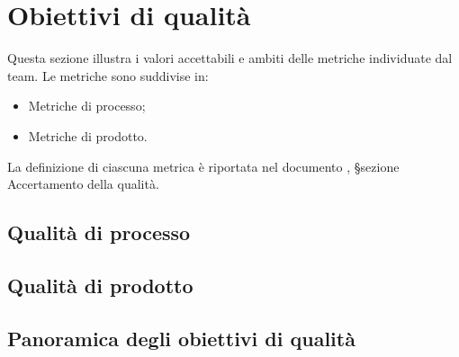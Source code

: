 \section{Obiettivi di qualità}

\par Questa sezione illustra i valori accettabili e ambiti delle metriche individuate dal team. Le metriche sono suddivise in:
\begin{itemize}
  \item Metriche di processo;
  \item Metriche di prodotto.
\end{itemize}

\par La definizione di ciascuna metrica è riportata nel documento \NormeDiProgetto, §sezione Accertamento della qualità.

\subsection{Qualità di processo}


\subsection{Qualità di prodotto}


\subsection{Panoramica degli obiettivi di qualità}
